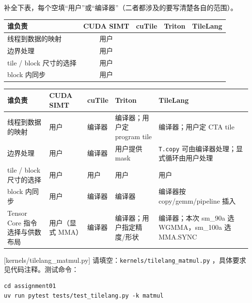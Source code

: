 \documentclass[11pt,a4paper,fontset=fandol]{ctexart}
\begin{document}
补全下表，每个空填“用户”或“编译器”（二者都涉及的要写清楚各自的范围）。

\begin{center}\small
\begin{tabular}{@{}lcccc@{}}
\toprule
谁负责 & CUDA SIMT & cuTile & Triton & TileLang \\
\midrule
线程到数据的映射 & 用户 & & & \\
边界处理 & 用户 & & & \\
tile / block 尺寸的选择 & 用户 & & & \\
block 内同步 & 用户 & & & \\
\bottomrule
\end{tabular}
\end{center}

\newpage
\begin{answer}
\begin{center}\small
\setlength{\tabcolsep}{3pt}
\begin{tabular}{@{}
  >{\raggedright\arraybackslash}p{}
  >{\raggedright\arraybackslash}p{}
  >{\raggedright\arraybackslash}p{}
  >{\raggedright\arraybackslash}p{}
  >{\raggedright\arraybackslash}p{}@{}}
\toprule
谁负责 & CUDA SIMT & cuTile & Triton & TileLang \\
\midrule
线程到数据的映射 & 用户 & 编译器 & 编译器；用户定 program tile & 编译器；用户定 CTA tile \\
边界处理 & 用户 & 编译器 & 用户提供 mask & \texttt{T.copy} 可由编译器处理；显式循环由用户处理 \\
tile / block 尺寸的选择 & 用户 & 用户 & 用户 & 用户 \\
block 内同步 & 用户 & 编译器 & 编译器 & 编译器按 copy/gemm/pipeline 插入 \\
Tensor Core 指令选择与供数布局 & 用户（显式 MMA） & 编译器 & 编译器；用户指定精度/形状 & 编译器；本次 sm\_90a 选 WGMMA，sm\_100a 选 MMA.SYNC \\
\bottomrule
\end{tabular}
\end{center}
\end{answer}

[kernels/tilelang\_matmul.py]
请填空：\texttt{kernels/tilelang\_matmul.py} ，具体要求见代码注释。测试命令：

\begin{lstlisting}
cd assignment01
uv run pytest tests/test_tilelang.py -k matmul
\end{lstlisting}
\end{document}
